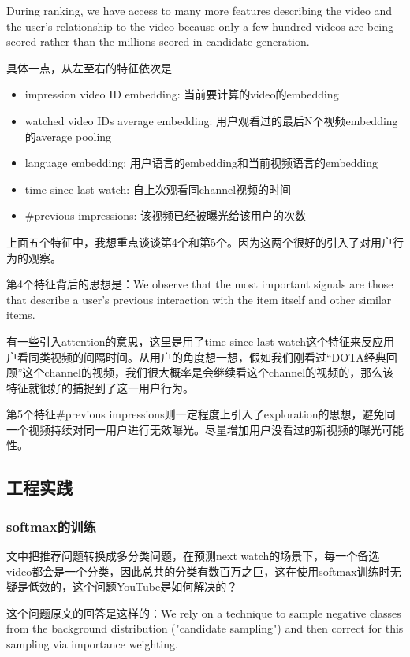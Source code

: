 \documentclass[12pt]{article}
\begin{document}
During ranking, we have access to many more features describing the video and the user's relationship to the video because only a few hundred videos are being scored rather than the millions scored in candidate generation.

具体一点，从左至右的特征依次是
\begin{itemize}
\setlength{\itemsep}{0pt}
\setlength{\parsep}{0pt}
\setlength{\parskip}{0pt}
    \item impression video ID embedding: 当前要计算的video的embedding
    \item watched video IDs average embedding: 用户观看过的最后N个视频embedding的average pooling
    \item language embedding: 用户语言的embedding和当前视频语言的embedding
    \item time since last watch: 自上次观看同channel视频的时间
    \item \#previous impressions: 该视频已经被曝光给该用户的次数
\end{itemize}

上面五个特征中，我想重点谈谈第4个和第5个。因为这两个很好的引入了对用户行为的观察。

第4个特征背后的思想是：We observe that the most important signals are those that describe a user's previous interaction with the item itself and other similar items.

有一些引入attention的意思，这里是用了time since last watch这个特征来反应用户看同类视频的间隔时间。从用户的角度想一想，假如我们刚看过“DOTA经典回顾”这个channel的视频，我们很大概率是会继续看这个channel的视频的，那么该特征就很好的捕捉到了这一用户行为。

第5个特征\#previous impressions则一定程度上引入了exploration的思想，避免同一个视频持续对同一用户进行无效曝光。尽量增加用户没看过的新视频的曝光可能性。

\subsection{工程实践}
\subsubsection{softmax的训练}
文中把推荐问题转换成多分类问题，在预测next watch的场景下，每一个备选video都会是一个分类，因此总共的分类有数百万之巨，这在使用softmax训练时无疑是低效的，这个问题YouTube是如何解决的？

这个问题原文的回答是这样的：We rely on a technique to sample negative classes from the background distribution ("candidate sampling") and then correct for this sampling via importance weighting.
\end{document}
